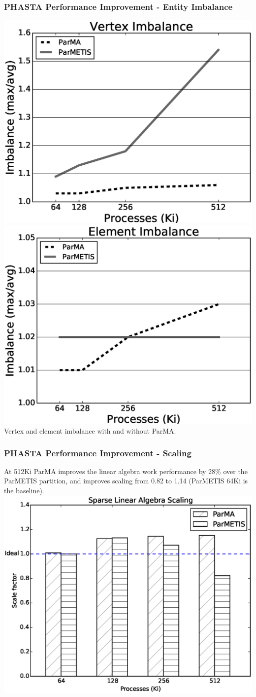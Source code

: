 \documentclass{beamer}
\begin{document}
\begin{frame}
  \frametitle{PHASTA Performance Improvement - Entity Imbalance}
  \centering
  \includegraphics[width=.5\textwidth]{../parmaimprovement/results/phasta/1B/vtxImb.eps}
  \includegraphics[width=.5\textwidth]{../parmaimprovement/results/phasta/1B/elmImb.eps}\\
  Vertex and element imbalance with and without ParMA.
\end{frame}

\begin{frame}
  \frametitle{PHASTA Performance Improvement - Scaling}
  \centering
  At 512Ki ParMA improves the linear algebra work performance by 28\% over the
  ParMETIS partition, and improves scaling from 0.82 to 1.14 (ParMETIS 64Ki is
  the baseline).
  \centering
  \includegraphics[width=.75\textwidth]{../parmaimprovement/results/phasta/1B/linAlgWorkScaling.eps}
\end{frame}
\end{document}
